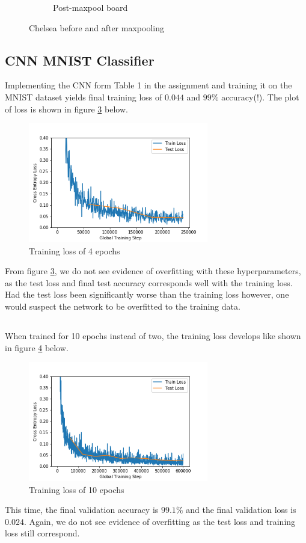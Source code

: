 \documentclass[]{article}
\begin{document}
\begin{figure}[H]
\begin{subfigure}[b]{0.3\textwidth}
         \caption{Post-maxpool board}
         \label{fig:checkerboard_after}
     \end{subfigure}
    \caption{Chelsea before and after maxpooling}
    \label{fig:checkerboard}
\end{figure}


\subsection{CNN MNIST Classifier}
Implementing the CNN form Table 1 in the assignment and training it on the MNIST dataset yields final training loss of $0.044$ and $99\%$ accuracy(!). The plot of loss is shown in figure \ref{fig:task2} below.
\begin{figure}[H]
\centering
\includegraphics[width=0.7\textwidth]{task2}
\caption{Training loss of 4 epochs}
\label{fig:task2}
\end{figure}
From figure \ref{fig:task2}, we do not see evidence of overfitting with these hyperparameters, as the test loss and final test accuracy corresponds well with the training loss. Had the test loss been significantly worse than the training loss however, one would suspect the network to be overfitted to the training data.

\subsection{}
When trained for 10 epochs instead of two, the training loss develops like shown in figure \ref{fig:task2_10epochs} below.
\begin{figure}[H]
\centering
\includegraphics[width=0.7\textwidth]{task2_10epochs}
\caption{Training loss of 10 epochs}
\label{fig:task2_10epochs}
\end{figure}
This time, the final validation accuracy is $99.1\%$ and the final validation loss is $0.024$. Again, we do not see evidence of overfitting as the test loss and training loss still correspond.
\end{document}
